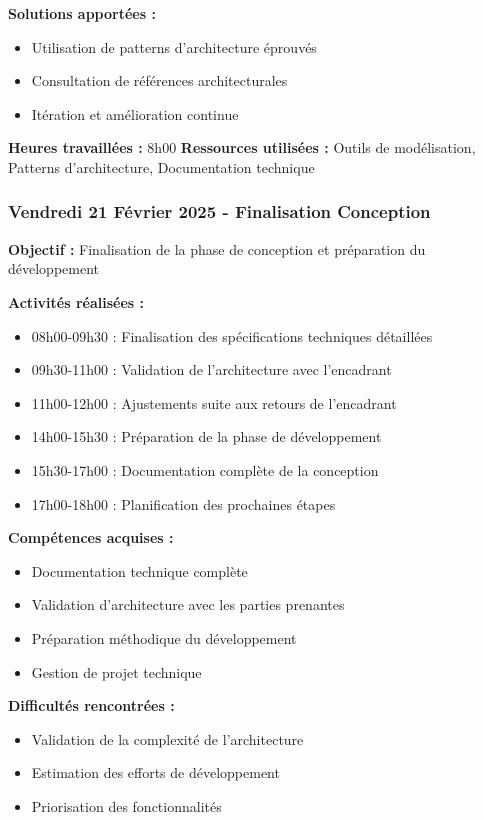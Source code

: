\textbf{Solutions apportées :}
\begin{itemize}
    \item Utilisation de patterns d'architecture éprouvés
    \item Consultation de références architecturales
    \item Itération et amélioration continue
\end{itemize}

\textbf{Heures travaillées :} 8h00
\textbf{Ressources utilisées :} Outils de modélisation, Patterns d'architecture, Documentation technique

\subsubsection{Vendredi 21 Février 2025 - Finalisation Conception}
\textbf{Objectif :} Finalisation de la phase de conception et préparation du développement

\textbf{Activités réalisées :}
\begin{itemize}
    \item 08h00-09h30 : Finalisation des spécifications techniques détaillées
    \item 09h30-11h00 : Validation de l'architecture avec l'encadrant
    \item 11h00-12h00 : Ajustements suite aux retours de l'encadrant
    \item 14h00-15h30 : Préparation de la phase de développement
    \item 15h30-17h00 : Documentation complète de la conception
    \item 17h00-18h00 : Planification des prochaines étapes
\end{itemize}

\textbf{Compétences acquises :}
\begin{itemize}
    \item Documentation technique complète
    \item Validation d'architecture avec les parties prenantes
    \item Préparation méthodique du développement
    \item Gestion de projet technique
\end{itemize}

\textbf{Difficultés rencontrées :}
\begin{itemize}
    \item Validation de la complexité de l'architecture
    \item Estimation des efforts de développement
    \item Priorisation des fonctionnalités
\end{itemize}

